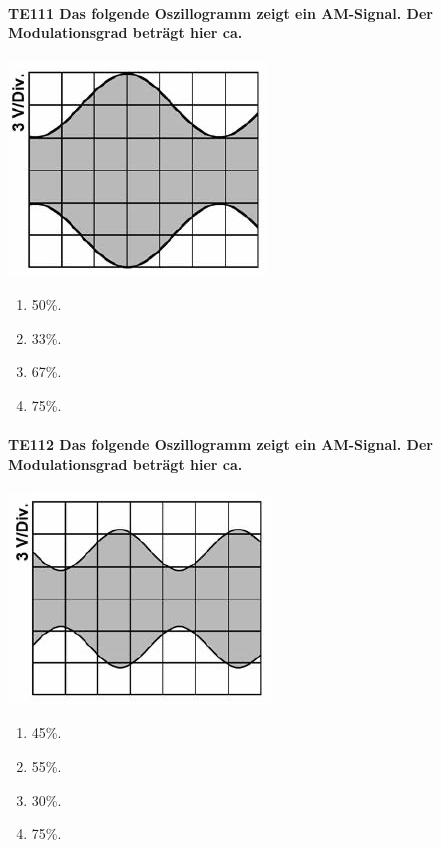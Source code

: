 \documentclass[8pt]{article}
\begin{document}
\begin{enumerate}
\begin{enumerate}[nolistsep,label=\Alph*]
\paragraph*{TE111 Das folgende Oszillogramm zeigt ein AM-Signal. Der Modulationsgrad beträgt hier ca.}
\begin{center}
	\begin{minipage}{\linewidth}
		\centering
		\includegraphics[scale=1.0]{pics/te111_a.jpg}
	\end{minipage}
\end{center}
\begin{enumerate}[nolistsep,label=\Alph*]
\item 50\%.
\item 33\%.
\item 67\%.
\item 75\%.
\end{enumerate}

\paragraph*{TE112 Das folgende Oszillogramm zeigt ein AM-Signal. Der Modulationsgrad beträgt hier ca.}
\begin{center}
	\begin{minipage}{\linewidth}
		\centering
		\includegraphics[scale=1.0]{pics/te112_a.jpg}
	\end{minipage}
\end{center}
\begin{enumerate}[nolistsep,label=\Alph*]
\item 45\%.
\item 55\%.
\item 30\%.
\item 75\%.
\end{enumerate}


\end{enumerate}
\end{enumerate}
\end{document}
